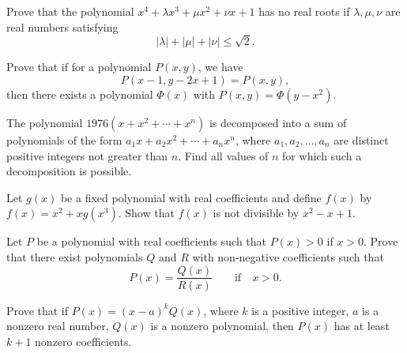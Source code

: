 \documentclass[12pt,a4paper]{memoir}
\theoremstyle{definition}
\begin{document}
\begin{question}[name={1971 IMO Shortlist}]
	Prove that the polynomial $x^4+\lambda x^3+\mu x^2+\nu x+1$ has no real roots if $\lambda, \mu , \nu $ are real numbers satisfying 
	\[|\lambda|+|\mu|+|\nu|\le \sqrt{2}.\]
\end{question}

\begin{question}[name={1976 IMO Longlist}]
	Prove that if for a polynomial $P(x, y)$, we have
	\[P(x - 1, y - 2x + 1) = P(x, y),\]
	then there exists a polynomial $\Phi(x)$ with $P(x, y) = \Phi(y - x^2).$
\end{question}


\begin{question}[name={1976 IMO Longlist}]
	The polynomial $1976(x+x^2+ \cdots +x^n)$ is decomposed into a sum of polynomials of the form $a_1x + a_2x^2 + \cdots + a_nx^n$, where $a_1, a_2, \ldots , a_n$ are distinct positive integers not greater than $n$. Find all values of $n$ for which such a decomposition is possible.	
\end{question}

\begin{question}[name={1976 IMO Longlist}]
	Let $g(x)$ be a fixed polynomial with real coefficients and define $f(x)$ by $f(x) =x^2 + xg(x^3)$. Show that $f(x)$ is not divisible by $x^2 - x + 1$.
\end{question}

\begin{question}[name={1976 IMO Longlist}]
	Let $P$ be a polynomial with real coefficients such that $P(x) > 0$ if $x > 0$. Prove that there exist polynomials $Q$ and $R$ with non-negative coefficients such that \[P(x) = \frac{Q(x)}{R(x)} \qquad \text{if} \quad x > 0.\]
\end{question}

\begin{question}[name={1976 IMO Longlist}]
	Prove that if $P(x) = (x-a)^kQ(x)$, where $k$ is a positive integer, $a$ is a nonzero real number, $Q(x)$ is a nonzero polynomial, then $P(x)$ has at least $k + 1$ nonzero coefficients.
\end{question}
\end{document}
